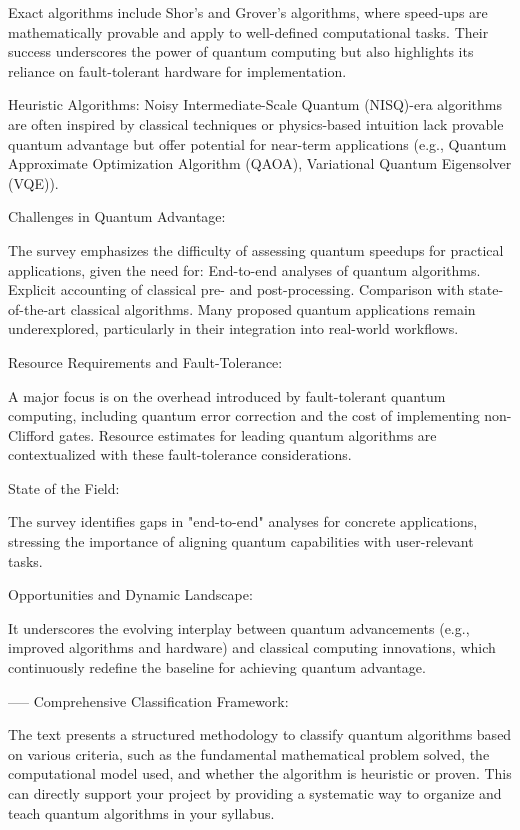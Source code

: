 Exact algorithms include Shor’s and Grover’s algorithms, where speed-ups are mathematically provable and apply to well-defined computational tasks.  
Their success underscores the power of quantum computing but also highlights its reliance on fault-tolerant hardware for implementation.

Heuristic Algorithms: Noisy Intermediate-Scale Quantum (NISQ)-era algorithms are often inspired by classical techniques or physics-based intuition 
lack provable quantum advantage but offer potential for near-term applications (e.g.,  Quantum Approximate Optimization Algorithm (QAOA), 
Variational Quantum Eigensolver (VQE)).

Challenges in Quantum Advantage:

The survey emphasizes the difficulty of assessing quantum speedups for practical applications, given the need for:
End-to-end analyses of quantum algorithms.
Explicit accounting of classical pre- and post-processing.
Comparison with state-of-the-art classical algorithms.
Many proposed quantum applications remain underexplored, particularly in their integration into real-world workflows.

Resource Requirements and Fault-Tolerance:

A major focus is on the overhead introduced by fault-tolerant quantum computing, including quantum error correction and the cost of implementing non-Clifford gates.
Resource estimates for leading quantum algorithms are contextualized with these fault-tolerance considerations.

State of the Field:

The survey identifies gaps in "end-to-end" analyses for concrete applications, stressing the importance of aligning quantum capabilities with user-relevant tasks.

Opportunities and Dynamic Landscape:

It underscores the evolving interplay between quantum advancements (e.g., improved algorithms and hardware) and classical computing innovations, which continuously redefine the baseline for achieving quantum advantage.

-----
Comprehensive Classification Framework:

The text presents a structured methodology to classify quantum algorithms based on various criteria, such as the fundamental mathematical problem solved, the computational model used, and whether the algorithm is heuristic or proven.
This can directly support your project by providing a systematic way to organize and teach quantum algorithms in your syllabus.

